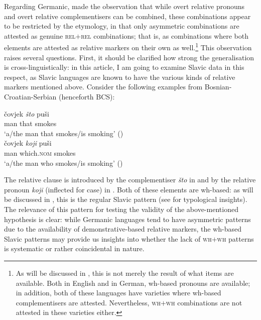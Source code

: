 \documentclass[output=paper]{langscibook}
\begin{document}
Regarding Germanic, \citet{bacskaiatkari2020jcgl} made the observation that while overt relative pronouns and overt relative complementisers can be combined, these combinations appear to be restricted by the etymology, in that only asymmetric combinations are attested as genuine \textsc{rel}$+$\textsc{rel} combinations; that is, as combinations where both elements are attested as relative markers on their own as well.\footnote{As will be discussed in , this is not merely the result of what items are available. Both in English and in German, wh-based pronouns are available; in addition, both of these languages have varieties where wh-based complementisers are attested. Nevertheless, \textsc{wh}$+$\textsc{wh} combinations are not attested in these varieties either.} This observation raises several questions. First, it should be clarified how strong the generalisation is cross-linguistically: in this article, I am going to examine Slavic data in this respect, as Slavic languages are known to have the various kinds of relative markers mentioned above. Consider the following examples from Bosnian-Croatian-Serbian (henceforth BCS):

\ea \label{bacsk:ex:sc}
\ea \gll čovjek \textit{što} puši \label{bacsk:ex:scstofirst}\\
man that smokes\\
\glt `a/the man that smokes/is smoking' \hfill (\citealt[27]{gracaninyuksek2013})\\
\ex \gll čovjek \textit{koji} puši \label{bacsk:ex:sckojifirst}\\
man which.\textsc{nom} smokes\\
\glt `a/the man who smokes/is smoking' \hfill (\citealt[26]{gracaninyuksek2013})
\z
\z

\noindent The relative clause is introduced by the complementiser \textit{što} in  and by the relative pronoun \textit{koji} (inflected for case) in . Both of these elements are wh-based: as will be discussed in , this is the regular Slavic pattern (see \citealt{auderset2020} for typological insights). The relevance of this pattern for testing the validity of the above-mentioned hypothesis is clear: while Germanic languages tend to have asymmetric patterns due to the availability of demonstrative-based relative markers, the wh-based Slavic patterns may provide us insights into whether the lack of \textsc{wh}$+$\textsc{wh} patterns is systematic or rather coincidental in nature.
\end{document}
